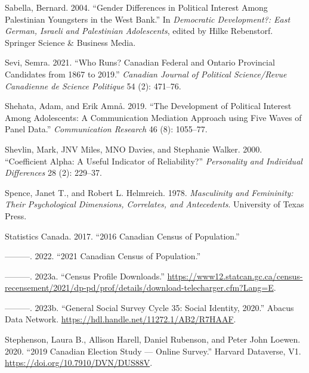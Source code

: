 \documentclass[
  letterpaper,
  DIV=11,
  numbers=noendperiod]{scrreprt}
\newlength{\cslhangindent}
\newlength{\cslentryspacingunit} %
\newenvironment{CSLReferences}[2] %
 {%
  \setlength{\parindent}{0pt}
  \ifodd #1
  \let\oldpar\par
  \def\par{\hangindent=\cslhangindent\oldpar}
  \fi
  \setlength{\parskip}{#2\cslentryspacingunit}
 }%
 {}
\begin{document}
\begin{CSLReferences}{1}{0}
\leavevmode{}%
Sabella, Bernard. 2004. {``{Gender Differences in Political Interest
Among Palestinian Youngsters in the West Bank}.''} In \emph{{Democratic
Development?: East German, Israeli and Palestinian Adolescents}}, edited
by Hilke Rebenstorf. Springer Science \& Business Media.

\leavevmode{}%
Sevi, Semra. 2021. {``{Who Runs? Canadian Federal and Ontario Provincial
Candidates from 1867 to 2019}.''} \emph{Canadian Journal of Political
Science/Revue Canadienne de Science Politique} 54 (2): 471--76.

\leavevmode{}%
Shehata, Adam, and Erik Amnå. 2019. {``{The Development of Political
Interest Among Adolescents: A Communication Mediation Approach using
Five Waves of Panel Data}.''} \emph{Communication Research} 46 (8):
1055--77.

\leavevmode{}%
Shevlin, Mark, JNV Miles, MNO Davies, and Stephanie Walker. 2000.
{``{Coefficient Alpha: A Useful Indicator of Reliability?}''}
\emph{Personality and Individual Differences} 28 (2): 229--37.

\leavevmode{}%
Spence, Janet T., and Robert L. Helmreich. 1978. \emph{{Masculinity and
Femininity: Their Psychological Dimensions, Correlates, and
Antecedents}}. University of Texas Press.

\leavevmode{}%
Statistics Canada. 2017. {``{2016 Canadian Census of Population}.''}

\leavevmode{}%
---------. 2022. {``{2021 Canadian Census of Population}.''}

\leavevmode{}%
---------. 2023a. {``{Census Profile Downloads}.''}
\url{https://www12.statcan.gc.ca/census-recensement/2021/dp-pd/prof/details/download-telecharger.cfm?Lang=E}.

\leavevmode{}%
---------. 2023b. {``{General Social Survey Cycle 35: Social Identity,
2020}.''} Abacus Data Network.
\url{https://hdl.handle.net/11272.1/AB2/R7HAAF}.

\leavevmode{}%
Stephenson, Laura B., Allison Harell, Daniel Rubenson, and Peter John
Loewen. 2020. {``{2019 Canadian Election Study --- Online Survey}.''}
Harvard Dataverse, V1. \url{https://doi.org/10.7910/DVN/DUS88V}.


\end{CSLReferences}
\end{document}
